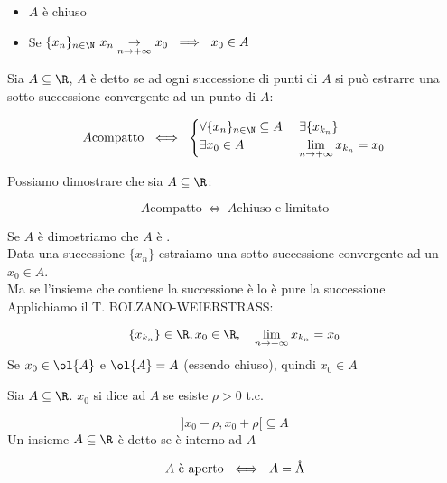 \documentclass[../appunti.tex]{subfiles}
\begin{document}
\begin{itemize}
	\item $A$ è chiuso
	\item Se $\{ x_n \}_{n \in \N}\ x_n 
	      \underset{\nti}{\to} x_0\ \implies\ x_0 \in A$
\end{itemize}


\begin{defn}
Sia $\acr$, $A$ è detto  se ad ogni successione di punti di $A$ si
può estrarre una sotto-successione convergente ad un punto di $A$:


\begin{equation}
	A \mbox{compatto}\ \iff\ 
	\begin{cases}
	\forall \{ x_n \}_{n \in \N} \subseteq A\ & \exists \{ x_{k_n} \}\\
	\exists x_0 \in A	 		  & \limm x_{k_n} = x_0
	\end{cases}
\end{equation}
\end{defn}
Possiamo dimostrare che sia $ \acr $:


\begin{equation}
	A \mbox{compatto}\ \iff\ A \mbox{chiuso e limitato}
\end{equation}


\begin{dimo}
Se $A$ è  dimostriamo che $A$ è .\\
Data una successione $ \{ x_n \} $ estraiamo una sotto-successione convergente
ad un $x_0 \in A$.\\
Ma se l'insieme che contiene la successione è 
 lo è pure la successione\\ 
Applichiamo il T. BOLZANO-WEIERSTRASS:


\begin{equation}
	\{x_{k_n}\} \in \R, x_0 \in \R,\quad \limm x_{k_n} = x_0
\end{equation}
Se $x_0 \in \ol{A}$ e $\ol{A} = A$ (essendo chiuso), quindi $ x_0 \in A $
\end{dimo}


\begin{defn}
Sia $\acr$. $x_0$ si dice  ad $A$ se esiste $\rho > 0$ t.c. 


\begin{equation}
] x_0 - \rho, x_0 + \rho [ \subseteq A
\end{equation}
Un insieme $ \acr$ è detto  se  è interno ad $A$


\begin{equation}
	A\ \mbox{è aperto}\ \iff\ A = \mbox{\r{A}}
\end{equation}
\end{defn}
\end{document}
